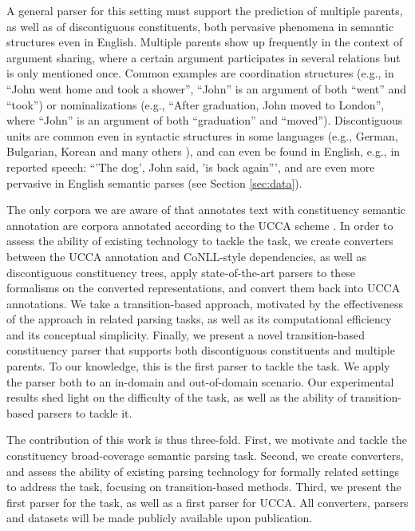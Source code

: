\documentclass[11pt]{article}
\newcommand{\secref}[1]{Section \ref{#1}}
\begin{document}
A general parser for this setting must support the prediction of multiple parents,
as well as of discontiguous constituents, both pervasive phenomena in semantic
structures even in English. Multiple parents show up frequently in the context of argument
sharing, where a certain argument participates in several relations but is only mentioned once.
Common examples are coordination structures
(e.g., in ``John went home and took a shower'', ``John'' is an argument of both ``went'' and ``took'')
or nominalizations (e.g., ``After graduation, John moved to London'', where ``John'' is an argument
of both ``graduation'' and ``moved'').
Discontiguous units are common even in syntactic structures in some languages (e.g., German, Bulgarian,
Korean and many others \cite{kallmeyer2013data}), and can even be found in English, e.g., in reported
speech: ``'The dog', John said, 'is back again''', and are even more pervasive in English semantic parses
(see \secref{sec:data}).

The only corpora we are aware of that annotates text with constituency semantic annotation are
corpora annotated according to the UCCA scheme \cite{abend2013universal,sulem2015conceptual}.
In order to assess the ability of existing technology to tackle the task,
we create converters between the UCCA annotation and CoNLL-style dependencies, as well as
discontiguous constituency trees, apply state-of-the-art parsers to these formalisms on
the converted representations, and convert them back into UCCA annotations.
We take a transition-based approach, motivated by the effectiveness of the approach in
related parsing tasks, as well as its computational efficiency and its conceptual simplicity.
Finally, we present a novel transition-based constituency parser that supports both discontiguous
constituents and multiple parents. To our knowledge, this is the first parser to tackle the task.
We apply the parser both to an in-domain and out-of-domain scenario.
Our experimental results shed light on the difficulty of the task, as well as the ability of
transition-based parsers to tackle it.

The contribution of this work is thus three-fold. First, we motivate and tackle the constituency broad-coverage
semantic parsing task. Second, we create converters, and assess the ability of existing parsing technology
for formally related settings to address the task, focusing on transition-based methods.
Third, we present the first parser for the task, as well as a first parser for UCCA.
All converters, parsers and datasets will be made publicly available upon publication.
\end{document}
